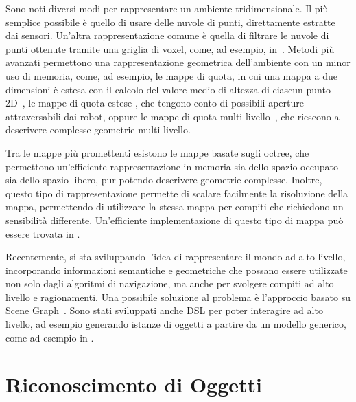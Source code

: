 Sono noti diversi modi per rappresentare un ambiente tridimensionale.
Il più semplice possibile è quello di usare delle nuvole di punti, direttamente estratte dai sensori. Un'altra rappresentazione comune è quella di filtrare le nuvole di punti ottenute tramite una griglia di voxel, come, ad esempio, in~\cite{30724}.
Metodi più avanzati permettono una rappresentazione geometrica dell'ambiente con un minor uso di memoria, come, ad esempio, le mappe di quota, in cui una mappa a due dimensioni è estesa con il calcolo del valore medio di altezza di ciascun punto 2D~\cite{herbert1989terrain}, le mappe di quota estese %
, che tengono conto di possibili aperture attraversabili dai robot, oppure le mappe di quota multi livello~\cite{4058725}, che riescono a descrivere complesse geometrie multi livello.

Tra le mappe più promettenti esistono le mappe basate sugli octree, che permettono un'efficiente rappresentazione in memoria sia dello spazio occupato sia dello spazio libero, pur potendo descrivere geometrie complesse. Inoltre, questo tipo di rappresentazione permette di scalare facilmente la risoluzione della mappa, permettendo di utilizzare la stessa mappa per compiti che richiedono un sensibilità differente.
Un'efficiente implementazione di questo tipo di mappa può essere trovata in \cite{hornung13auro}.

Recentemente, si sta sviluppando l'idea di rappresentare il mondo ad alto livello, incorporando informazioni semantiche e geometriche che possano essere utilizzate non solo dagli algoritmi di navigazione, ma anche per svolgere compiti ad alto livello e ragionamenti. Una possibile soluzione al problema è l'approccio basato su Scene Graph~\cite{6630614}. Sono stati sviluppati anche DSL %
per poter interagire ad alto livello, ad esempio generando istanze di oggetti a partire da un modello generico, come ad esempio in \cite{blumenthal2014towards}.

\section{Riconoscimento di Oggetti}

